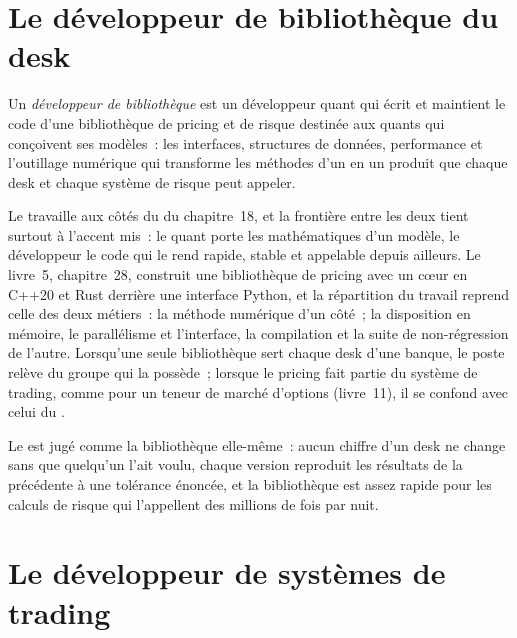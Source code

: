 \section{Le développeur de bibliothèque du desk}

\begin{definition}\label{def:in:quant-developer:library}
Un \emph{développeur de bibliothèque} est un développeur quant qui écrit et maintient le code
d'une bibliothèque de pricing et de risque destinée aux quants qui conçoivent ses modèles~: les interfaces, structures de données, performance et
l'outillage numérique qui transforme les méthodes d'un  en un produit que chaque desk et chaque système de risque peut appeler.
\end{definition}

Le  travaille aux côtés du  du chapitre~18, et la frontière entre les deux tient surtout à l'accent
mis~: le quant porte les mathématiques d'un modèle, le développeur le code qui le rend rapide, stable et appelable depuis
ailleurs. Le livre~5, chapitre~28, construit une bibliothèque de pricing avec un cœur en C++20 et Rust derrière une interface Python, et la
répartition du travail reprend celle des deux métiers~: la méthode numérique d'un côté~; la disposition en mémoire, le parallélisme et
l'interface, la compilation et la suite de non-régression de l'autre. Lorsqu'une seule bibliothèque sert chaque desk d'une banque, le poste
relève du groupe qui la possède~; lorsque le pricing fait partie du système de trading, comme pour un teneur de marché d'options (livre~11), il
se confond avec celui du .

Le  est jugé comme la bibliothèque elle-même~: aucun chiffre d'un desk ne change sans que quelqu'un l'ait voulu, chaque
version reproduit les résultats de la précédente à une tolérance énoncée, et la bibliothèque est assez rapide pour les calculs de risque qui
l'appellent des millions de fois par nuit.

\section{Le développeur de systèmes de trading}

